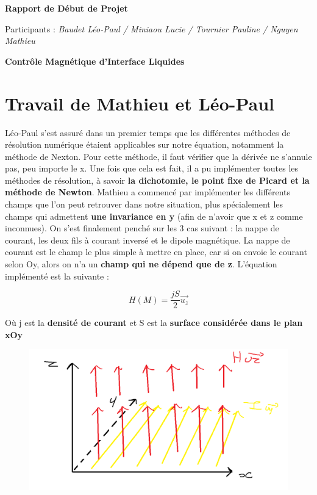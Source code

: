 \documentclass{article}
\begin{document}
\begin{center}
{\huge \textbf{Rapport de Début de Projet}}
\end{center}

\begin{center}
Participants : \textit{Baudet Léo-Paul / Miniaou Lucie / Tournier Pauline / Nguyen Mathieu\\}

\end{center}
\vspace{0.05\textheight}
\begin{center}
{\LARGE \textbf{Contrôle Magnétique d'Interface Liquides}}
\end{center}

\section{Travail de Mathieu et Léo-Paul}
Léo-Paul s'est assuré dans un premier temps que les différentes méthodes de résolution numérique étaient applicables sur notre équation, notamment la méthode de Nexton. Pour cette méthode, il faut vérifier que la dérivée ne s'annule pas, peu importe le x. Une fois que cela est fait, il a pu implémenter toutes les méthodes de résolution, à savoir \textbf{la dichotomie, le point fixe de Picard et la méthode de Newton}.
\newline
Mathieu a commencé par implémenter les différents champs que l'on peut retrouver dans notre situation, plus spécialement les champs qui admettent \textbf{une invariance en y} (afin de n'avoir que x et z comme inconnues). On s'est finalement penché sur les 3 cas suivant : la nappe de courant, les deux fils à courant inversé et le dipole magnétique.
\newline
La nappe de courant est le champ le plus simple à mettre en place, car si on envoie le courant selon Oy, alors on n'a un \textbf{champ qui ne dépend que de z}. L'équation implémenté est la suivante : 

\begin{equation}
H(M) = \frac{jS}{2}\vec{u_{z}}
\label{eq01}
\end{equation}

Où j est la \textbf{densité de courant} et S est la \textbf{surface considérée dans le plan xOy}
\begin{figure}[h]
	\centering
    \includegraphics[width=.5\linewidth]{Nappe.png}
    
\end{figure}
\end{document}
